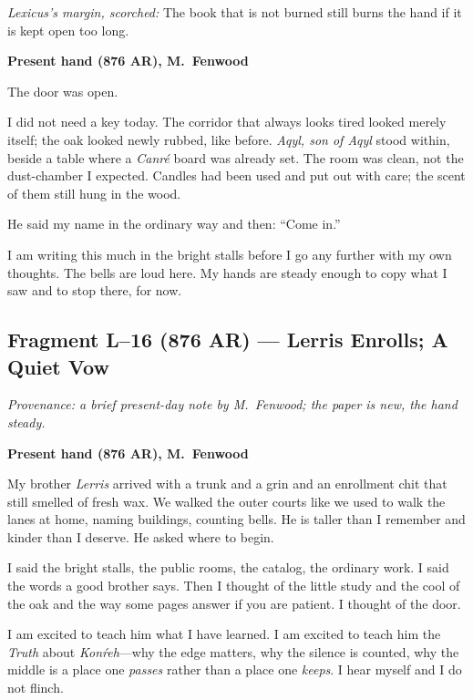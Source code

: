 \documentclass[11pt]{article}
\begin{document}
\medskip
\noindent\textit{Lexicus’s margin, scorched:} The book that is not burned still burns the hand if it is kept open too long.

\medskip
\noindent\textbf{Present hand (876 AR), M.\ Fenwood}

The door was open.

I did not need a key today. The corridor that always looks tired looked merely itself; the oak looked newly rubbed, like before. \textit{Aqyl, son of Aqyl} stood within, beside a table where a \textit{Canr\'e} board was already set. The room was clean, not the dust-chamber I expected. Candles had been used and put out with care; the scent of them still hung in the wood.

He said my name in the ordinary way and then: “Come in.”

I am writing this much in the bright stalls before I go any further with my own thoughts. The bells are loud here. My hands are steady enough to copy what I saw and to stop there, for now.

\subsection{Fragment L--16 (876 AR) --- Lerris Enrolls; A Quiet Vow}
\label{frag:l16}
{}

\noindent\textit{Provenance: a brief present-day note by M.\ Fenwood; the paper is new, the hand steady.}

\medskip
\noindent\textbf{Present hand (876 AR), M.\ Fenwood}

My brother \textit{Lerris} arrived with a trunk and a grin and an enrollment chit that still smelled of fresh wax. We walked the outer courts like we used to walk the lanes at home, naming buildings, counting bells. He is taller than I remember and kinder than I deserve. He asked where to begin.

I said the bright stalls, the public rooms, the catalog, the ordinary work. I said the words a good brother says. Then I thought of the little study and the cool of the oak and the way some pages answer if you are patient. I thought of the door.

I am excited to teach him what I have learned. I am excited to teach him the \textit{Truth} about \textit{Kon\'reh}—why the edge matters, why the silence is counted, why the middle is a place one \emph{passes} rather than a place one \emph{keeps}. I hear myself and I do not flinch.
\end{document}
